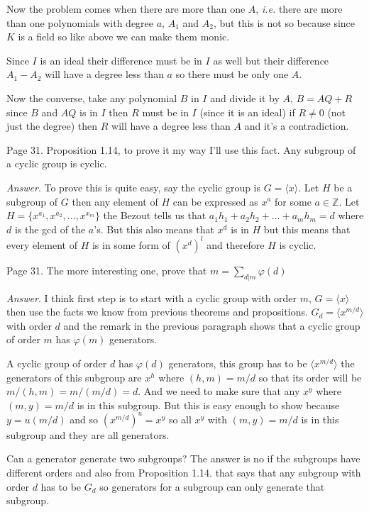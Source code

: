 \documentclass[aps,preprint,preprintnumbers,nofootinbib,showpacs,prd]{revtex4-1}
\newcommand{\ie}{{\it i.e.} }
\begin{document}
Now the problem comes when there are more than one $A$, \ie there are more than one polynomials with degree $a$, $A_1$ and $A_2$, but this is not so because since $K$ is a field so like above we can make them monic. 

Since $I$ is an ideal their difference must be in $I$ as well but their difference $A_1 - A_2$ will have a degree less than $a$ so there must be only one $A$. 

Now the converse, take any polynomial $B$ in $I$ and divide it by $A$, $B = AQ + R$ since $B$ and $AQ$ is in $I$ then $R$ must be in $I$ (since it is an ideal) if $R \neq 0$ (not just the degree) then $R$ will have a degree less than $A$ and it's a contradiction. 


Page 31. Proposition 1.14, to prove it my way I'll use this fact. Any subgroup of a cyclic group is cyclic. 

{\it Answer}. To prove this is quite easy, say the cyclic group is $G = \langle x \rangle$. Let $H$ be a subgroup of $G$ then any element of $H$ can be expressed as $x^a$ for some $a \in \mathbb{Z}$. Let $H = \{x^{a_1}, x^{a_2}, \dots , x^{x_m}\}$ the Bezout tells us that $a_1 h_1 + a_2 h_2 + \dots + a_m h_m = d$ where $d$ is the gcd of the $a$'s. But this also means that $x^d$ is in $H$ but this means that every element of $H$ is in some form of $(x^d)^l$ and therefore $H$ is cyclic. 

Page 31. The more interesting one, prove that $m = \sum_{d|m} \varphi(d)$

{\it Answer}. I think first step is to start with a cyclic group with order $m$, $G = \langle x \rangle$ then use the facts we know from previous theorems and propositions. $G_d = \langle x^{m/d} \rangle$ with order $d$ and the remark in the previous paragraph shows that a cyclic group of order $m$ has $\varphi(m)$ generators. 

A cyclic group of order $d$ has $\varphi(d)$ generators, this group has to be $\langle x^{m/d} \rangle$ the generators of this subgroup are $x^h$ where $(h,m) = m/d$ so that its order will be $m/(h,m) = m/(m/d) = d$. And we need to make sure that any $x^y$ where $(m,y) = m/d$ is in this subgroup. But this is easy enough to show because $y = u (m/d)$ and so $(x^{m/d})^u = x^y$ so all $x^y$ with $(m,y) = m/d$ is in this subgroup and they are all generators. 

Can a generator generate two subgroups? The answer is no if the subgroups have different orders and also from Proposition 1.14. that says that  any subgroup with order $d$ has to be $G_d$ so generators for a subgroup can only generate that subgroup.
\end{document}

